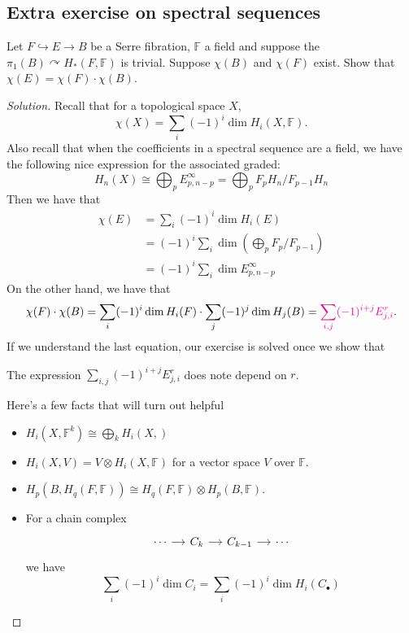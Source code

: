 \documentclass{article}
\numberwithin{equation}{section}
\begin{document}
\subsection{Extra exercise on spectral sequences}\label{ssec:Extra exercise on spectral sequences}
\begin{exercise}[June 20]
	Let $F\hookrightarrow E\to B$ be a Serre fibration, $\mathbb{F}$ a field and suppose the $\pi_{1}(B)\curvearrowright  H_{*}(F,\mathbb{F})$ is trivial. Suppose $\chi(B)$ and $\chi(F)$ exist. Show that $\chi(E)=\chi(F)\cdot \chi(B)$.
\end{exercise}
\begin{proof}[Solution]
	Recall that for a topological space $X$,
	\[\chi(X)=\sum_{i}(-1)^i\dim H_{i}(X,\mathbb{F}).\]
	Also recall that when the coefficients in a spectral sequence are a field, we have the following nice expression for the associated graded:
	\[H_{n}(X)\cong \bigoplus_{p}E^\infty_{p,n-p}=\bigoplus_{p} F_{p}H_{n}/F_{p-1}H_{n} \]
	Then we have that 
	\begin{align*}
		\chi(E)&=\sum_{i}(-1)^i\dim H_{i}(E)\\
		       &=(-1)^i\sum_{i}\dim \left( \bigoplus_{p}F_{p}/F_{p-1}   \right)\\
		       &=(-1)^i\sum_{i}\dim E^\infty_{p,n-p}
	\end{align*}
	On the other hand, we have that
	\[\chi(F)\cdot \chi(B)=\sum_{i}(-1)^i\dim H_{i}(F)\cdot \sum_{j}(-1)^{j}\dim H_{j}(B)={\color{magenta}\sum_{i,j}(-1)^{i+j}E^r_{j,i}}.\]
	If we understand the last equation, our exercise is solved once we show that
	\begin{claim}
		The expression $\sum_{i,j}(-1)^{i+j}E^r_{j,i}$	does note depend on $r$.
	\end{claim}
	

	Here's a few facts that will turn out helpful
	\begin{itemize}
		\item $H_{i}(X,\mathbb{F}^k)\cong \bigoplus_{k} H_{i}(X,\mathbb{}) $
		\item $H_{i}(X,V)=V\otimes H_{i}(X,\mathbb{F})$ for a vector space $V$ over $\mathbb{F}$.
		\item $H_{p}(B,H_{q}(F,\mathbb{F}))\cong H_{q}(F,\mathbb{F})\otimes H_{p}(B,\mathbb{F})$.
		\item For a chain complex 
			\[\begin{tikzcd}[column sep=small]
				\cdots \arrow[r]&C_{k}\arrow[r]&C_{k-1}\arrow[r]&\cdots
			\end{tikzcd}\]
			we have
			\[\sum_{i}(-1)^i\dim C_i=\sum_{i}(-1)^i\dim H_{i}(C_{\bullet})\]
	\end{itemize}
	
\end{proof}
\end{document}
